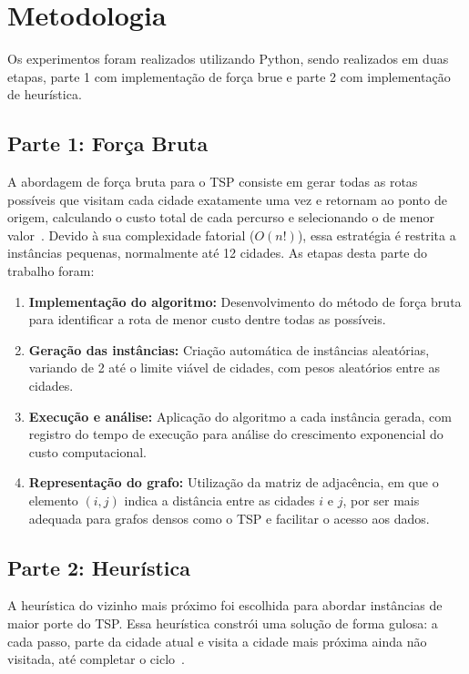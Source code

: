 \documentclass{article}
\begin{document}
\section{Metodologia}

Os experimentos foram realizados utilizando Python, sendo realizados em duas etapas, parte 1 com implementação de força brue e parte 2 com implementação de heurística.

\subsection{Parte 1: Força Bruta}

A abordagem de força bruta para o TSP consiste em gerar todas as rotas possíveis que visitam cada cidade exatamente uma vez e retornam ao ponto de origem, calculando o custo total de cada percurso e selecionando o de menor valor~\cite{lawler1985tsp}. Devido à sua complexidade fatorial ($O(n!)$), essa estratégia é restrita a instâncias pequenas, normalmente até 12 cidades. As etapas desta parte do trabalho foram:

\begin{enumerate}
    \item \textbf{Implementação do algoritmo:} Desenvolvimento do método de força bruta para identificar a rota de menor custo dentre todas as possíveis.
    \item \textbf{Geração das instâncias:} Criação automática de instâncias aleatórias, variando de 2 até o limite viável de cidades, com pesos aleatórios entre as cidades.
    \item \textbf{Execução e análise:} Aplicação do algoritmo a cada instância gerada, com registro do tempo de execução para análise do crescimento exponencial do custo computacional.
    \item \textbf{Representação do grafo:} Utilização da matriz de adjacência, em que o elemento $(i, j)$ indica a distância entre as cidades $i$ e $j$, por ser mais adequada para grafos densos como o TSP e facilitar o acesso aos dados.
\end{enumerate}


\subsection{Parte 2: Heurística}

A heurística do vizinho mais próximo foi escolhida para abordar instâncias de maior porte do TSP. Essa heurística constrói uma solução de forma gulosa: a cada passo, parte da cidade atual e visita a cidade mais próxima ainda não visitada, até completar o ciclo~\cite{ufpr_tsp}. 
\end{document}
